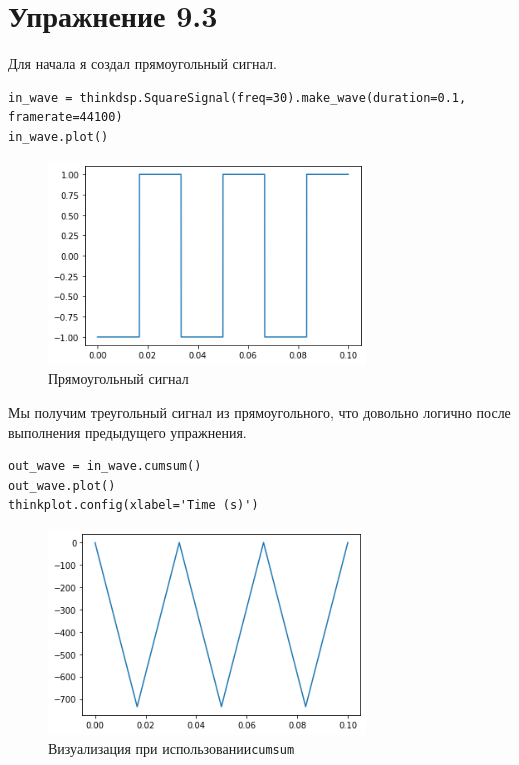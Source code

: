 \documentclass[a4paper,12pt]{report}
\begin{document}
\chapter{Упражнение 9.3}

Для начала я создал прямоугольный сигнал.

\begin{lstlisting}[caption=Создание сигнала]
in_wave = thinkdsp.SquareSignal(freq=30).make_wave(duration=0.1, framerate=44100)
in_wave.plot()
\end{lstlisting}

\begin{figure}[H]
        \centering
        \includegraphics[width=0.75\textwidth]{4.png}
        \caption{Прямоугольный сигнал}
        \label{4}
\end{figure}

Мы получим треугольный сигнал из прямоугольного, что довольно логично после выполнения предыдущего упражнения.

\begin{lstlisting}[caption=Визуализация при \texttt{cumsum}]
out_wave = in_wave.cumsum()
out_wave.plot()
thinkplot.config(xlabel='Time (s)')
\end{lstlisting}

\begin{figure}[H]
        \centering
        \includegraphics[width=0.75\textwidth]{5.png}
        \caption{Визуализация при использовании\texttt{cumsum}}
        \label{5}
\end{figure}
\end{document}
